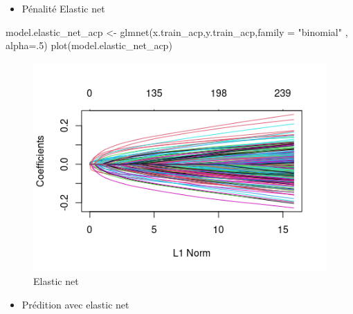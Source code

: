 \documentclass[
  12pt,
]{article}
\newenvironment{Shaded}{\begin{snugshade}}{\end{snugshade}}
\newcommand{\AttributeTok}[1]{\textcolor[rgb]{0.77,0.63,0.00}{#1}}
\newcommand{\DecValTok}[1]{\textcolor[rgb]{0.00,0.00,0.81}{#1}}
\newcommand{\FunctionTok}[1]{\textcolor[rgb]{0.00,0.00,0.00}{#1}}
\newcommand{\NormalTok}[1]{#1}
\newcommand{\OtherTok}[1]{\textcolor[rgb]{0.56,0.35,0.01}{#1}}
\newcommand{\StringTok}[1]{\textcolor[rgb]{0.31,0.60,0.02}{#1}}
\providecommand{\tightlist}{%
  \setlength{\itemsep}{0pt}\setlength{\parskip}{0pt}}
\begin{document}
\begin{itemize}
\tightlist
\item
  Pénalité Elastic net
\end{itemize}

\begin{Shaded}
\begin{Highlighting}[]
\NormalTok{model.elastic\_net\_acp }\OtherTok{\textless{}{-}} \FunctionTok{glmnet}\NormalTok{(x.train\_acp,y.train\_acp,}\AttributeTok{family =} \StringTok{"binomial"}\NormalTok{ , }\AttributeTok{alpha=}\NormalTok{.}\DecValTok{5}\NormalTok{)}
\FunctionTok{plot}\NormalTok{(model.elastic\_net\_acp)}
\end{Highlighting}
\end{Shaded}

\begin{figure}

{\centering \includegraphics[width=0.5\linewidth]{pictures/elastic_net_acp} 

}

\caption{Elastic net}\label{fig:elastic_net_acp}
\end{figure}

\begin{itemize}
\tightlist
\item
  Prédition avec elastic net
\end{itemize}
\end{document}
